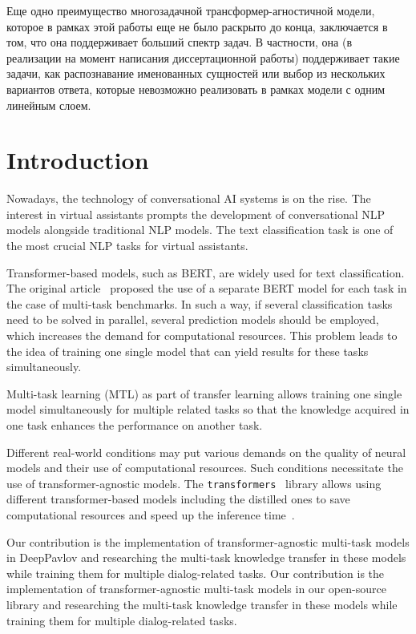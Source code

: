 Еще одно преимущество многозадачной трансформер-агностичной модели, которое в рамках этой работы еще не было раскрыто до конца, заключается в том, что она поддерживает больший спектр задач. В частности, она (в реализации на момент написания диссертационной работы) поддерживает такие задачи, как распознавание именованных сущностей или выбор из нескольких вариантов ответа, которые невозможно реализовать в рамках модели с одним линейным слоем. 




\section{Introduction}
Nowadays, the technology of conversational AI systems is on the rise. The interest in virtual assistants prompts the development of conversational NLP models alongside traditional NLP models. The text classification task is one of the most crucial NLP tasks for virtual assistants.

Transformer-based models, such as BERT, are widely used for text classification. The original article~\cite{bert} proposed the use of a separate BERT model for each task in the case of multi-task benchmarks. In such a way, if several classification tasks need to be solved in parallel, several prediction models should be employed, which increases the demand for computational resources. This problem leads to the idea of training one single model that can yield results for these tasks simultaneously. 

Multi-task learning (MTL) as part of transfer learning allows training one single model simultaneously for multiple related tasks so that the knowledge acquired in one task enhances the performance on another task.

Different real-world conditions may put various demands on the quality of neural models and their use of computational resources. Such conditions necessitate the use of transformer-agnostic models. The \texttt{transformers}~\cite{huggingface_transformers} library allows using different transformer-based models including the distilled ones to save computational resources and speed up the inference time~\cite{alina}. 

\ifinterspeechfinal
Our contribution is the implementation of transformer-agnostic multi-task models in DeepPavlov and researching the multi-task knowledge transfer in these models while training them for multiple dialog-related tasks.
\else
Our contribution is the implementation of transformer-agnostic multi-task models in our open-source library and researching the multi-task knowledge transfer in these models while training them for multiple dialog-related tasks.
\fi
